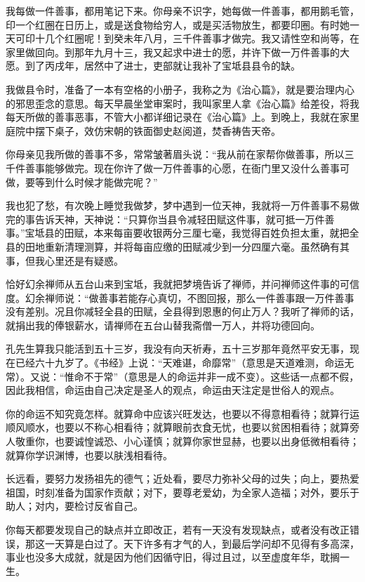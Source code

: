 \documentclass[12pt,UTF8]{ctexbook}
\begin{document}
我每做一件善事，都用笔记下来。你母亲不识字，她每做一件善事，都用鹅毛管，印一个红圈在日历上，或是送食物给穷人，或是买活物放生，都要印圈。有时她一天可印十几个红圈呢！到癸未年八月，三千件善事才做完。我又请性空和尚等，在家里做回向。到那年九月十三，我又起求中进士的愿，并许下做一万件善事的大愿。到了丙戌年，居然中了进士，吏部就让我补了宝坻县县令的缺。

我做县令时，准备了一本有空格的小册子，我称之为《治心篇》，就是要治理内心的邪思歪念的意思。每天早晨坐堂审案时，我叫家里人拿《治心篇》给差役，将我每天所做的善事恶事，不管大小都详细记录在《治心篇》上。到晚上，我就在家里庭院中摆下桌子，效仿宋朝的铁面御史赵阅道，焚香祷告天帝。

你母亲见我所做的善事不多，常常皱著眉头说：“我从前在家帮你做善事，所以三千件善事能够做完。现在你许了做一万件善事的心愿，在衙门里又没什么善事可做，要等到什么时候才能做完呢？”

我也犯了愁，有次晚上睡觉我做梦，梦中遇到一位天神，我就将一万件善事不易做完的事告诉天神，天神说：“只算你当县令减轻田赋这件事，就可抵一万件善事。”宝坻县的田赋，本来每亩要收银两分三厘七毫，我觉得百姓负担太重，就把全县的田地重新清理测算，并将每亩应缴的田赋减少到一分四厘六毫。虽然确有其事，但我心里还是有疑惑。

恰好幻余禅师从五台山来到宝坻，我就把梦境告诉了禅师，并问禅师这件事的可信度。幻余禅师说：“做善事若能存心真切，不图回报，那么一件善事跟一万件善事没有差别。况且你减轻全县的田赋，全县得到恩惠的何止万人？我听了禅师的话，就捐出我的俸银薪水，请禅师在五台山替我斋僧一万人，并将功德回向。

孔先生算我只能活到五十三岁，我没有向天祈寿，五十三岁那年竟然平安无事，现在已经六十九岁了。《书经》上说：“天难谌，命靡常”（意思是天道难测，命运无常）。又说：“惟命不于常”（意思是人的命运并非一成不变）。这些话一点都不假，因此我相信，命运由自己决定是圣人的观点，命运由天注定是世俗人的观点。

你的命运不知究竟怎样。就算命中应该兴旺发达，也要以不得意相看待；就算行运顺风顺水，也要以不称心相看待；就算眼前衣食无忧，也要以贫困相看待；就算旁人敬重你，也要诚惶诚恐、小心谨慎；就算你家世显赫，也要以出身低微相看待；就算你学识渊博，也要以肤浅相看待。

长远看，要努力发扬祖先的德气；近处看，要尽力弥补父母的过失；向上，要热爱祖国，时刻准备为国家作贡献；对下，要尊老爱幼，为全家人造福；对外，要乐于助人；对内，要检讨反省自己。

你每天都要发现自己的缺点并立即改正，若有一天没有发现缺点，或者没有改正错误，那这一天算是白过了。天下许多有才气的人，到最后学问却不见得有多高深，事业也没多大成就，就是因为他们因循守旧，得过且过，以至虚度年华，耽搁一生。
\end{document}
